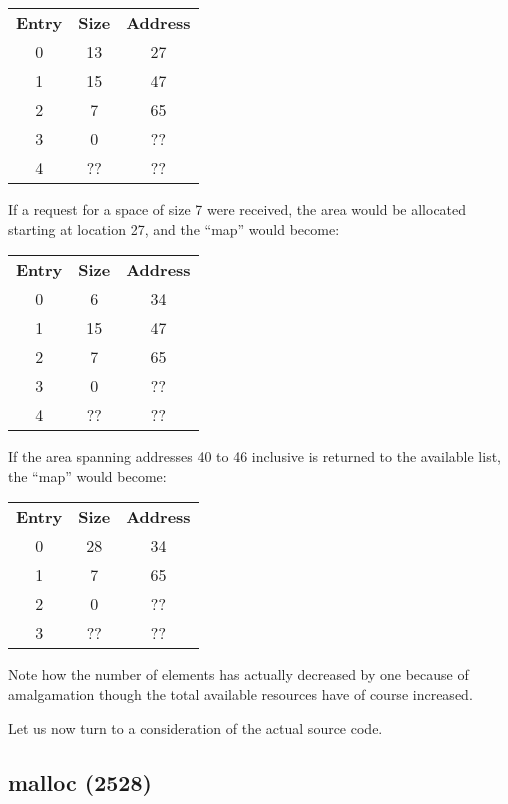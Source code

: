 \begin{center}
\begin{tabular}{ccc}
{\bf Entry} & {\bf Size} & {\bf Address}\\
0 & 13 & 27\\
1 & 15 & 47\\
2 & 7 & 65\\
3 & 0 & ??\\
4 & ?? & ??\\
\end{tabular}
\end{center}

If a request for a space of size 7 were
received, the area would be allocated
starting at location 27, and the ``map''
would become:

\begin{center}
\begin{tabular}{ccc}
{\bf Entry} & {\bf Size} & {\bf Address}\\
0 & 6 & 34\\
1 & 15 & 47\\
2 & 7 & 65\\
3 & 0 & ??\\
4 & ?? & ??\\
\end{tabular}
\end{center}

If the area spanning addresses 40 to 46
inclusive is returned to the available
list, the ``map'' would become:

\begin{center}
\begin{tabular}{ccc}
{\bf Entry} & {\bf Size} & {\bf Address}\\
0 & 28 & 34\\
1 & 7 & 65\\
2 & 0 & ??\\
3 & ?? & ??\\
\end{tabular}
\end{center}

Note how the number of elements has
actually decreased by one because of
amalgamation though the total available
resources have of course increased.

Let us now turn to a consideration of
the actual source code.


\subsection{malloc (2528)}

